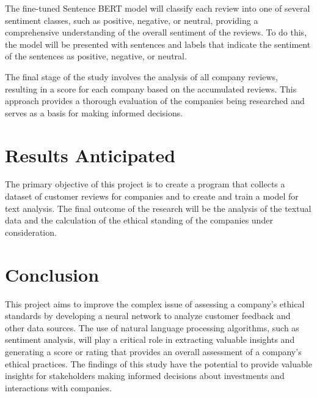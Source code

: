 \documentclass[PI]{ProjectProposal}
\begin{document}
The fine-tuned Sentence BERT model will classify each review into one of several sentiment classes, such as positive, negative, or neutral, providing a comprehensive understanding of the overall sentiment of the reviews. To do this, the model will be presented with sentences and labels that indicate the sentiment of the sentences as positive, negative, or neutral.

The final stage of the study involves the analysis of all company reviews, resulting in a score for each company based on the accumulated reviews. This approach provides a thorough evaluation of the companies being researched and serves as a basis for making informed decisions.
\chapter{Results Anticipated}
\label{sec:orgc78b196}
The primary objective of this project is to create a program that collects a dataset of customer reviews for companies and to create and train a model for text analysis. The final outcome of the research will be the analysis of the textual data and the calculation of the ethical standing of the companies under consideration.
\chapter{Conclusion}
\label{sec:org413f1c9}
This project aims to improve the complex issue of assessing a company's ethical standards by developing a neural network to analyze customer feedback and other data sources. The use of natural language processing algorithms, such as sentiment analysis, will play a critical role in extracting valuable insights and generating a score or rating that provides an overall assessment of a company's ethical practices. The findings of this study have the potential to provide valuable insights for stakeholders making informed decisions about investments and interactions with companies.

\putbibliography
\appendix
\end{document}
